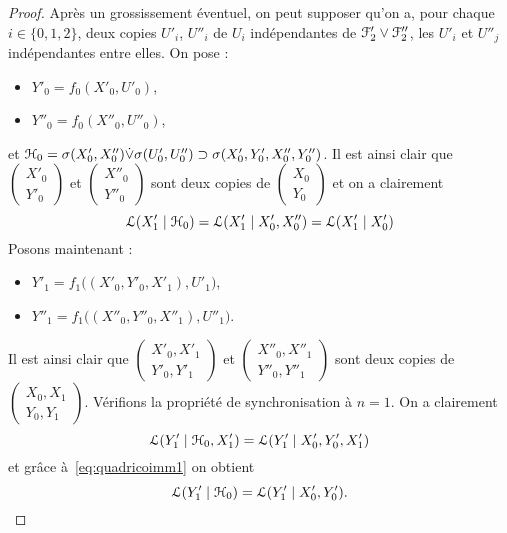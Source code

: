 \documentclass[12pt,a4paper]{article}
\begin{document}
\begin{appendices}
\begin{proof}
Après un grossissement éventuel, on peut supposer qu'on a, pour chaque $i\in\{0,1,2\}$, 
deux copies $U'_i$, $U''_i$  
de $U_i$ indépendantes de $\EuScript{F}'_2\vee \EuScript{F}''_2$, les $U'_i$ et $U''_j$ indépendantes entre elles. 
On pose :
\begin{itemize}
\item $Y'_0 = f_0(X'_0, U'_0)$,
\item $Y''_0 = f_0(X''_0, U''_0)$, 
\end{itemize}
et  $\EuScript{H}_0 = \sigma(X'_0, X''_0) \dot{\vee} \sigma(U'_0, U''_0) \supset \sigma(X'_0, Y'_0, X''_0, Y''_0)$. 
Il est ainsi clair que $\left(\begin{smallmatrix}
X'_0 \\ Y'_0 \end{smallmatrix}\right)$ et 
$\left(\begin{smallmatrix}
X''_0 \\ Y''_0 \end{smallmatrix}\right)$ sont deux copies de 
$\left(\begin{smallmatrix}
X_0 \\ Y_0 \end{smallmatrix}\right)$ et on a clairement 
\begin{equation}\label{eq:quadricoimm1}
\EuScript{L}(X'_1 \mid \EuScript{H}_0) = \EuScript{L}(X'_1 \mid X'_0, X''_0) = \EuScript{L}(X'_1 \mid X'_0)
\end{equation}
Posons maintenant :
\begin{itemize}
\item $Y'_1= f_1\bigl((X'_0, Y'_0, X'_1), U'_1\bigr)$,
\item $Y''_1 = f_1\bigl((X''_0, Y''_0, X''_1), U''_1\bigr)$.
\end{itemize}
Il est ainsi clair que $\left(\begin{smallmatrix}
X'_0, X'_1 \\ Y'_0, Y'_1 \end{smallmatrix}\right)$ et 
$\left(\begin{smallmatrix}
X''_0, X''_1 \\ Y''_0, Y''_1 \end{smallmatrix}\right)$ sont deux copies de 
$\left(\begin{smallmatrix}
X_0, X_1 \\ Y_0, Y_1 \end{smallmatrix}\right)$. 
Vérifions la propriété de synchronisation à $n=1$. On a clairement 
$$
\EuScript{L}(Y'_1 \mid \EuScript{H}_0, X'_1) = \EuScript{L}(Y'_1 \mid X'_0, Y'_0, X'_1) 
$$
et grâce à~\eqref{eq:quadricoimm1} on obtient 
$$
\EuScript{L}(Y'_1 \mid \EuScript{H}_0) = \EuScript{L}(Y'_1 \mid X'_0, Y'_0).  
$$
\end{proof}
\end{appendices}
\end{document}
